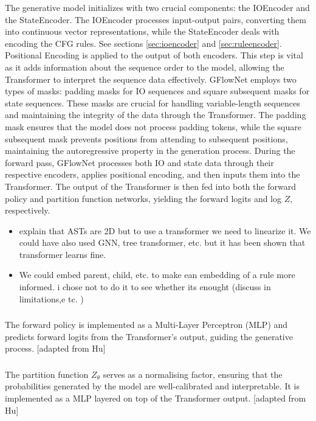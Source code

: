The generative model initializes with two crucial components: the IOEncoder and the StateEncoder. The IOEncoder processes input-output pairs, converting them into continuous vector representations, while the StateEncoder deals with encoding the CFG rules. See sections \ref{sec:ioencoder} and \ref{sec:ruleencoder}.
Positional Encoding is applied to the output of both encoders. This step is vital as it adds information about the sequence order to the model, allowing the Transformer to interpret the sequence data effectively.
GFlowNet employs two types of masks: padding masks for IO sequences and square subsequent masks for state sequences. These masks are crucial for handling variable-length sequences and maintaining the integrity of the data through the Transformer. The padding mask ensures that the model does not process padding tokens, while the square subsequent mask prevents positions from attending to subsequent positions, maintaining the autoregressive property in the generation process.
During the forward pass, GFlowNet processes both IO and state data through their respective encoders, applies positional encoding, and then inputs them into the Transformer. The output of the Transformer is then fed into both the forward policy and partition function networks, yielding the forward logits and log $Z$, respectively.


\begin{itemize}
    \item explain that ASTs are 2D but to use a transformer we need to linearize it. We could have also used GNN, tree transformer, etc. but it has been shown that transformer learns fine. 
    \item We could embed parent, child, etc. to make ean embedding of a rule more informed. i chose not to do it to see whether its enought (discuss in limitations,e tc. )
\end{itemize}


\subsubsection{}
The forward policy is implemented as a Multi-Layer Perceptron (MLP) and predicts forward logits from the Transformer's output, guiding the generative process.
[adapted from Hu]
\subsubsection{}
The partition function $Z_\theta$ serves as a normalising factor, ensuring that the probabilities generated by the model are well-calibrated and interpretable. It is implemented as a MLP layered on top of the Transformer output.
[adapted from Hu]


